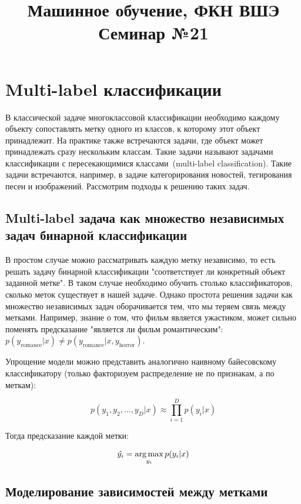 \documentclass[12pt,fleqn]{article}
\title{Машинное обучение, ФКН ВШЭ\\Семинар №21}
\author{}
\date{}
\begin{document}
\maketitle



\section{Multi-label классификации}

В классической задаче многоклассовой классификации необходимо каждому объекту сопоставлять метку одного из классов, к которому этот объект принадлежит. На практике также встречаются задачи, где объект может принадлежать сразу нескольким классам. Такие задачи называют задачами классификации с пересекающимися классами~(multi-label classification). Такие задачи встречаются, например, в задаче категорирования новостей, тегирования песен и изображений. Рассмотрим подходы к решению таких задач.

\subsection{Multi-label задача как множество независимых задач бинарной классификации}

В простом случае можно рассматривать каждую метку независимо, то есть решать задачу бинарной классификации "соответствует ли конкретный объект заданной метке". В таком случае необходимо обучить столько классификаторов, сколько меток существует в нашей задаче. Однако простота решения задачи как множество независимых задач оборачивается тем, что мы теряем связь между метками. Например, знание о том, что фильм является ужастиком, может сильно поменять предсказание "является ли фильм романтическим": $p(y_{\mbox{romance}} | x) \ne p(y_{\mbox{romance}} | x, y_{\mbox{horror}})$.

Упрощение модели можно представить аналогично наивному байесовскому классификатору (только факторизуем распределение не по признакам, а по меткам):

$$
p(y_1, y_2, \dots, y_D | x) \approx \prod_{i=1}^{D} p(y_i | x)
$$

Тогда предсказание каждой метки:

$$
\hat{y_i} = \mathop{\rm arg\,max}\limits_{y_i} p(y_i | x)
$$

\subsection{Моделирование зависимостей между метками}
\end{document}
